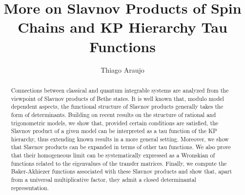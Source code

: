 \documentclass[a4paper,12pt]{amsart}
\begin{document}

\title[Slavnov products, KP and BA functions]{More on Slavnov Products of Spin Chains and KP Hierarchy Tau Functions}

\author{Thiago Araujo}

\address{
Universidade Federal Fluminense, 
Instituto de Ciências Exatas, Departamento de Física
Volta Redonda, RJ, Brazil
}


\begin{abstract}
 Connections between classical and quantum integrable systems are analyzed from the viewpoint of Slavnov products of Bethe states. It is well known that, modulo model dependent aspects, the functional structure of Slavnov products generally takes the form of determinants. Building on recent results on the structure of rational and trigonometric models, we show that, provided certain conditions are satisfied, the Slavnov product of a given model can be interpreted as a tau function of the KP hierarchy, thus extending known results in a more general setting. Moreover, we show that Slavnov products can be expanded in terms of other tau functions. We also prove that their homogeneous limit can be systematically expressed as a Wronskian of functions related to the eigenvalues of the transfer matrices.  Finally, we compute the Baker-Akhiezer functions associated with these Slavnov products and show that, apart from a universal multiplicative factor, they admit a closed determinantal representation.
\end{abstract}


\maketitle
\end{document}
